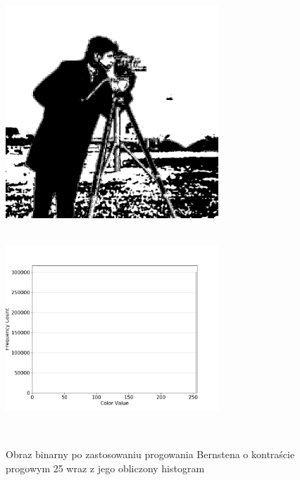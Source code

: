 \documentclass[a4paper,12pt]{book}
\begin{document}
\begin{figure}[H]
	\caption{Obraz binarny po zastosowaniu progowania Bernstena o kontraście progowym 25 wraz z jego obliczony histogram}
	\includegraphics[width=8cm, height=8cm]{5-4/local-threshold-image-photoman-25.png}
	\includegraphics[width=8cm, height=8cm]{5-4/local-threshold-photoman-25.png}
	

\end{figure}
\end{document}

